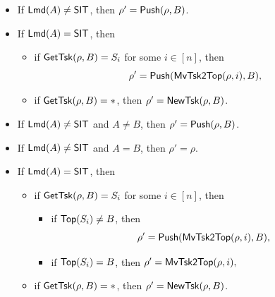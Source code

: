 \medskip	
	
	\noindent {}
	
	
\begin{itemize}
				\item If ${\sf Lmd}(A) \neq \mathsf{SIT}$, then $\rho'= \mathsf{Push}(\rho,B)$.
				\item If ${\sf Lmd}(A) = \mathsf{SIT}$, then
		    		\begin{itemize}
			    			\item if $\mathsf{GetTsk}(\rho, B)=S_i$ for some $i\in[n]$,  then 
						$$\rho'=\mathsf{Push}(\mathsf{MvTsk2Top}(\rho, i),B),$$
			    			\item if $\mathsf{GetTsk}(\rho, B)=*$, then $\rho'= \mathsf{NewTsk}(\rho,B )$.
			    		\end{itemize}
\end{itemize}
	
	
	
	\noindent {}
	\begin{itemize}
		\item  If ${\sf Lmd}(A) \neq \mathsf{SIT}$ and $A \neq B$, then $\rho' = \mathsf{Push}(\rho,B)$.
		\item  If ${\sf Lmd}(A) \neq \mathsf{SIT}$ and $A = B$, then $\rho' =  \rho$.
		\item If ${\sf Lmd}(A) = \mathsf{SIT}$, then
		\begin{itemize}
			\item if $\mathsf{GetTsk}(\rho, B)=S_i$ for some $i\in[n]$,  then
			\begin{itemize}
				\item if $\mathsf{Top}(S_i)\neq B$, then 
				$$\rho'=\mathsf{Push}(\mathsf{MvTsk2Top}(\rho, i),B),$$
				\item if $\mathsf{Top}(S_i)= B$, then $\rho'=\mathsf{MvTsk2Top}(\rho, i),$
			\end{itemize}
			\item if $\mathsf{GetTsk}(\rho, B)=*$, then $\rho'= \mathsf{NewTsk}(\rho,B )$.
		\end{itemize}
	\end{itemize}
	
